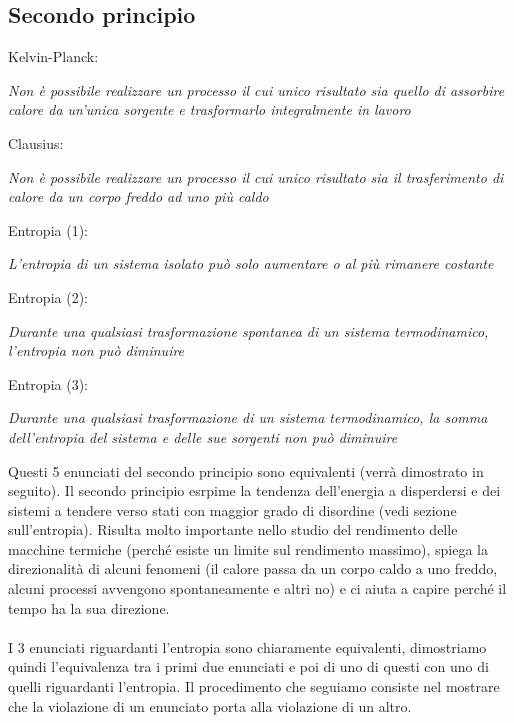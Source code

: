 \documentclass{article}
\begin{document}
\subsection{Secondo principio}
Kelvin-Planck:
\begin{center}
     \textit{Non è possibile realizzare un processo il cui unico risultato sia quello di assorbire calore da un'unica sorgente e trasformarlo integralmente in lavoro}
\end{center}
Clausius:
\begin{center}
     \textit{Non è possibile realizzare un processo il cui unico risultato sia il trasferimento di calore da un corpo freddo ad uno più caldo}
\end{center}
Entropia (1):
\begin{center}
     \textit{L'entropia di un sistema isolato può solo aumentare o al più rimanere costante}
\end{center}
Entropia (2):
\begin{center}
     \textit{Durante una qualsiasi trasformazione spontanea di un sistema termodinamico, l'entropia non può diminuire}
\end{center}
Entropia (3):
\begin{center}
     \textit{Durante una qualsiasi trasformazione di un sistema termodinamico, la somma dell'entropia del sistema e delle sue sorgenti non può diminuire}
\end{center}
Questi 5 enunciati del secondo principio sono equivalenti (verrà dimostrato in seguito). Il secondo principio esrpime la tendenza dell'energia a disperdersi e dei sistemi a tendere verso stati con maggior grado di disordine (vedi sezione sull'entropia). Risulta molto importante nello studio del rendimento delle macchine termiche (perché esiste un limite sul rendimento massimo), spiega la direzionalità di alcuni fenomeni (il calore passa da un corpo caldo a uno freddo, alcuni processi avvengono spontaneamente e altri no) e ci aiuta a capire perché il tempo ha la sua direzione.\\\\
I 3 enunciati riguardanti l'entropia sono chiaramente equivalenti, dimostriamo quindi l'equivalenza tra i primi due enunciati e poi di uno di questi con uno di quelli riguardanti l'entropia. Il procedimento che seguiamo consiste nel mostrare che la violazione di un enunciato porta alla violazione di un altro.
\end{document}
